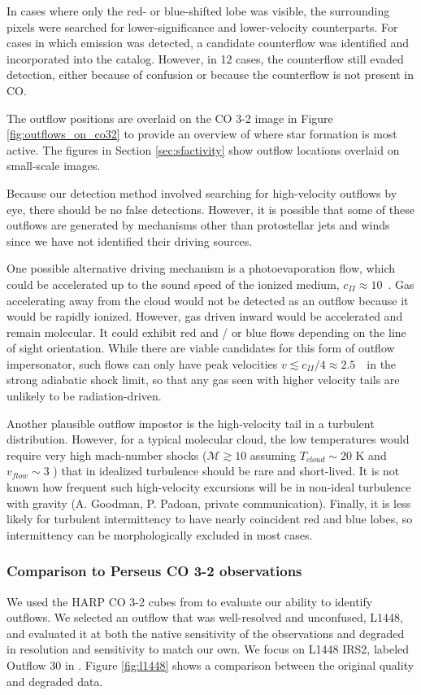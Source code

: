 In cases where only the red- or blue-shifted lobe was visible, the
surrounding pixels were searched for lower-significance and lower-velocity
counterparts.  For cases in which emission was detected, a
candidate counterflow was identified and incorporated into the catalog.
However, in 12 cases, the counterflow still evaded detection, either because of
confusion or because the counterflow is not present in CO.

The outflow positions are overlaid on the CO 3-2 image in Figure
\ref{fig:outflows_on_co32} to provide an overview of where star formation is
most active.  The figures in Section \ref{sec:sfactivity}  show outflow
locations overlaid on small-scale images.

Because our detection method involved searching for high-velocity outflows
by eye, there should be no false detections.  However, it is possible
that some of these outflows are generated by mechanisms other than
protostellar jets and winds since we have not identified their driving sources.

One possible alternative driving mechanism is a photoevaporation flow,
which could be accelerated up to the sound speed of the ionized medium,
$c_{II} \approx 10$~\kms.
Gas accelerating away from the cloud would not be detected as an outflow
because it would be rapidly ionized.
However, gas driven inward would be accelerated and remain molecular.  It
could exhibit red and / or blue flows depending on the line of
sight orientation.  While there are viable candidates for this form of outflow
impersonator, such flows can only have peak velocities $v\lesssim c_{II}/4
\approx 2.5$~\kms\ in the strong adiabatic shock limit, so that any gas
seen with higher velocity tails are unlikely to be radiation-driven.  

Another plausible outflow impostor is the high-velocity tail in a
turbulent distribution.  However, for a typical molecular cloud, the low
temperatures would require very high mach-number shocks ($\mathcal{M}\gtrsim10$
assuming $T_{cloud}\sim20 $ K and $v_{flow} \sim 3$ \kms) that in idealized
turbulence should be rare and short-lived.  It is not known how frequent such
high-velocity excursions will be in non-ideal turbulence with gravity (A.
Goodman, P. Padoan, private communication).  Finally, it is less likely for
turbulent intermittency to have nearly coincident red and blue lobes, so
intermittency can be morphologically excluded in most cases. 


\subsubsection{Comparison to Perseus CO 3-2 observations}  %
\label{sec:percompare}
We used the HARP CO 3-2 cubes from \citet{hatchell2007} to evaluate our ability
to identify outflows.  We selected an outflow that was
well-resolved and unconfused, L1448, and evaluated it at both the native
sensitivity of the \citet{hatchell2007} observations and degraded in resolution
and sensitivity to match our own.  We focus on L1448 IRS2,
labeled Outflow 30 in \citet{hatchell2007}. Figure \ref{fig:l1448} shows a
comparison between the original quality and degraded data.  

